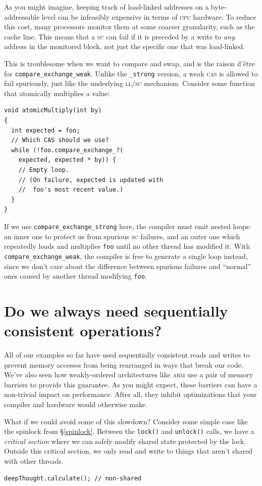 \documentclass[fontsize=10pt, numbers=endperiod]{scrartcl}
\newcommand{\codesize}{\fontsize{10pt}{12pt}}
\newcommand{\monobox}[1]{\mbox{\texttt{#1}}}
\newcommand{\introduce}[1]{\textit{#1}}
\newcommand{\secref}[1]{\hyperref[#1]{\textsc{\S}\ref*{#1}}}
\newenvironment{colfigure}
  {\par\vspace{1\baselineskip minus 0.5\baselineskip}\noindent\minipage{\linewidth}}
  {\endminipage\vspace*{1\baselineskip minus 0.7\baselineskip}}
\begin{document}
\begin{multicols}{2}
As you might imagine, keeping track of load-linked addresses on a
byte-addressable level can be infeasibly expensive in terms of \textsc{cpu} hardware.
To reduce this cost, many processors monitor them at some coarser
granularity, such as the cache line.
This means that a \textsc{sc}
can fail if it is preceded by a write to \emph{any} address in the monitored block,
not just the specific one that was load-linked.

This is troublesome when we want to compare and swap,
and is the raison d'être for \monobox{compare\_exchange\_weak}.
Unlike the \monobox{\_strong} version, a weak \textsc{cas}
is allowed to fail spuriously, just like the underlying \textsc{ll/sc} mechanism.
Consider some function that atomically multiplies a value:
\begin{colfigure}
\begin{verbatim}
void atomicMultiply(int by)
{
  int expected = foo;
  // Which CAS should we use?
  while (!foo.compare_exchange_?(
    expected, expected * by)) {
    // Empty loop.
    // (On failure, expected is updated with
    //  foo's most recent value.)
  }
}
\end{verbatim}
\end{colfigure}
If we use \monobox{compare\_exchange\_strong} here,
the compiler must emit nested loops:
an inner one to protect us from spurious \textsc{sc} failures,
and an outer one which repeatedly loads and multiplies \texttt{foo} until no
other thread has modified it.
With \monobox{compare\_exchange\_weak},
the compiler is free to generate a single loop instead,
since we don't care about the difference between spurious failures and ``normal''
ones caused by another thread modifying \texttt{foo}.

\section{Do we always need sequentially consistent operations?}
\label{lock-example}

All of our examples so far have used sequentially consistent reads and writes
to prevent memory accesses from being rearranged in ways that break our code.
We've also seen how weakly-ordered architectures like \textsc{arm}
use a pair of memory barriers to provide this guarantee.
As you might expect, these barriers can have a non-trivial impact on performance.
After all,
they inhibit optimizations that your compiler and hardware would otherwise make.

What if we could avoid some of this slowdown?
Consider some simple case like the spinlock from \secref{spinlock}.
Between the \texttt{lock()} and \texttt{unlock()} calls,
we have a \introduce{critical section}
where we can safely modify shared state protected by the lock.
Outside this critical section,
we only read and write to things that aren't
shared with other threads.
\begin{colfigure}
\begin{verbatim}
deepThought.calculate(); // non-shared


\end{verbatim}
\end{colfigure}
\end{multicols}
\end{document}
